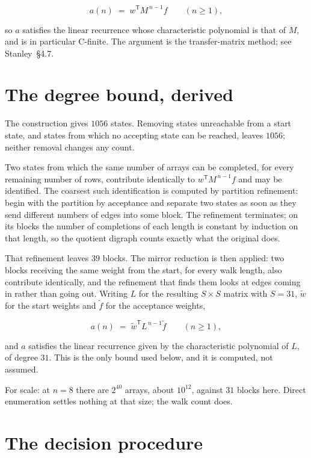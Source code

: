 \documentclass[11pt]{article}
\theoremstyle{definition}
\begin{document}
\[a(n) \;=\; w^{\mathsf T} M^{\,n-1} f \qquad (n \ge 1),\]

so $a$ satisfies the linear recurrence whose characteristic polynomial is that of $M$, and is in particular C-finite. The argument is the transfer-matrix method; see Stanley~\S4.7.

\section{The degree bound, derived}

The construction gives $1056$ states. Removing states unreachable from a start state, and states from which no accepting state can be reached, leaves $1056$; neither removal changes any count.

Two states from which the same number of arrays can be completed, for every remaining number of rows, contribute identically to $w^{\mathsf T}M^{\,n-1}f$ and may be identified. The coarsest such identification is computed by partition refinement: begin with the partition by acceptance and separate two states as soon as they send different numbers of edges into some block. The refinement terminates; on its blocks the number of completions of each length is constant by induction on that length, so the quotient digraph counts exactly what the original does.

That refinement leaves $39$ blocks. The mirror reduction is then applied: two blocks receiving the same weight from the start, for every walk length, also contribute identically, and the refinement that finds them looks at edges coming in rather than going out. Writing $L$ for the resulting $S \times S$ matrix with $S = 31$, $\tilde w$ for the start weights and $\tilde f$ for the acceptance weights,

\[a(n) \;=\; \tilde w^{\mathsf T} L^{\,n-1} \tilde f \qquad (n \ge 1),\]

and $a$ satisfies the linear recurrence given by the characteristic polynomial of $L$, of degree $31$. This is the only bound used below, and it is computed, not assumed.

For scale: at $n = 8$ there are $2^{40}$ arrays, about $10^{12}$, against $31$ blocks here. Direct enumeration settles nothing at that size; the walk count does.

\section{The decision procedure}
\end{document}
